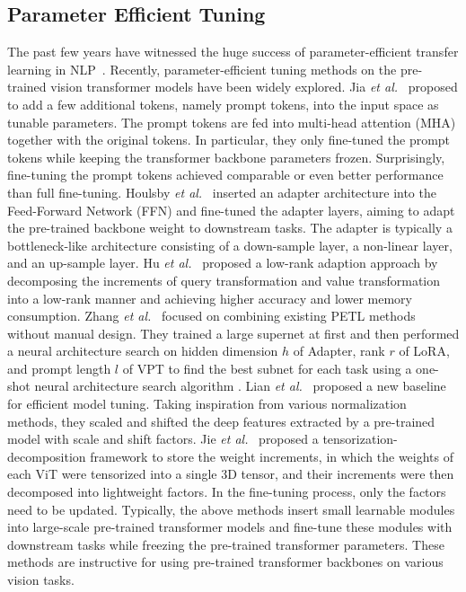 \documentclass[10pt,journal,letterpaper,compsoc]{IEEEtran}
\begin{document}
\subsection{Parameter Efficient Tuning}
The past few years have witnessed the huge success of parameter-efficient transfer learning in NLP~\cite{PES_LLMFT, DBLP:conf/coling/ZhouMZCGZHXW22, DBLP:journals/corr/abs-2210-16771, LadderSideTune, UniPELT, DeltaTuning}. Recently, parameter-efficient tuning methods on the pre-trained vision transformer models have been widely explored. Jia \emph{et al.}~\cite{vpt} proposed to add a few additional tokens, namely prompt tokens, into the input space as tunable parameters. The prompt tokens are fed into multi-head attention (MHA) together with the original tokens.
In particular, they only fine-tuned the prompt tokens while keeping the transformer backbone parameters frozen. Surprisingly, fine-tuning the prompt tokens achieved comparable or even better performance than full fine-tuning. Houlsby \emph{et al.}~\cite{adapter} inserted an adapter architecture into the Feed-Forward Network (FFN) and fine-tuned the adapter layers, aiming to adapt the pre-trained backbone weight to downstream tasks. The adapter is typically a bottleneck-like architecture consisting of a down-sample layer, a non-linear layer, and an up-sample layer. Hu \emph{et al.}~\cite{Lora} proposed a low-rank adaption approach by decomposing the increments of query transformation and value transformation into a low-rank manner and achieving higher accuracy and lower memory consumption.
Zhang \emph{et al.}~\cite{NOAH} focused on combining existing PETL methods without manual design. They trained a large supernet at first and then performed a neural architecture search on hidden dimension $h$ of Adapter, rank $r$ of LoRA, and prompt length $l$ of VPT to find the best subnet for each task using a one-shot neural architecture search algorithm \cite{2021AutoFormer}. Lian \emph{et al.}~\cite{SSF} proposed a new baseline for efficient model tuning. Taking inspiration from various normalization methods, they scaled and shifted the deep features extracted by a pre-trained model with scale and shift factors. Jie \emph{et al.}~\cite{FacT} proposed a tensorization-decomposition framework to store the weight increments, in which the weights of each ViT were tensorized into a single 3D tensor, and their increments were then decomposed into lightweight factors. In the fine-tuning process, only the factors need to be updated. Typically, the above methods insert small learnable modules into large-scale pre-trained transformer models and fine-tune these modules with downstream tasks while freezing the pre-trained transformer parameters. These methods are instructive for using pre-trained transformer backbones on various vision tasks. 
\end{document}
